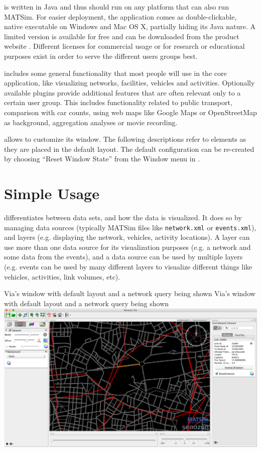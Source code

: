 \Via{} is written in Java and thus should run on any platform that can also run
MATSim. For easier deployment, the application comes as double-clickable, native
executable on Windows and Mac OS X, partially hiding its Java nature. A
limited version is available for free and can be downloaded from the product
website \citep[][]{senozonVIA_Webpage_2015}. 
Different licenses for commercial usage or for research or educational purposes
exist in order to serve the different users groups best.

\Via{} includes some general functionality that most people will use in the core
application, like visualizing networks, facilities, vehicles and activities.
Optionally available plugins provide additional features that are
often relevant only to a certain user group. This includes functionality related
to public transport, comparison with car counts, using web maps like Google Maps
or OpenStreetMap as background, aggregation analyses or movie recording.

\Via{} allows to customize its window. The following descriptions refer to
elements as they are placed in the default layout. The default configuration can
be re-created by choosing ``Reset Window State'' from the Window menu in \Via{}.


\section{Simple Usage}

\Via{} differentiates between data sets, and how the data is visualized. It
does so by managing data sources (typically MATSim files like {\tt network.xml}
or {\tt events.xml}), and layers (e.g. displaying the network, vehicles,
activity locations). A layer can use more than one data source for its
visualization purposes (e.g. a network and some data from the events), and a
data source can be used by multiple layers (e.g. events can be used by many
different layers to visualize different things like vehicles, activities, link
volumes, etc).

\createfigure%
{Via's window with default layout and a network query being shown}%
{Via's window with default layout and a network query being shown}%
{\label{fig:via:window}}%
{\includegraphics[width=1.\textwidth,angle=0]{./extending/figures/via/window.png}}%
{}


